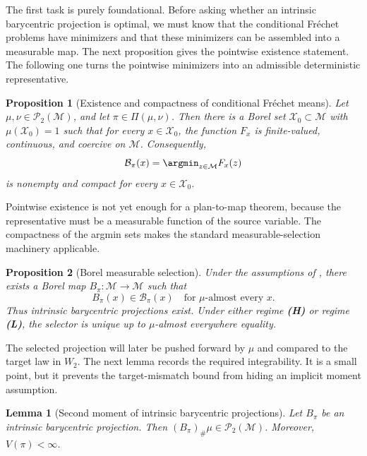 \documentclass[10pt]{article} %
\newtheorem{proposition}[proposition]{Proposition}
\newtheorem{lemma}[lemma]{Lemma}
\theoremstyle{definition}
\providecommand{\1}{\mathbf{1}}
\providecommand{\sM}{\mathcal{M}}
\providecommand{\sX}{\mathcal{X}}
\begin{document}
The first task is purely foundational. Before asking whether an intrinsic barycentric projection is optimal, we must know that the conditional Fr\'echet problems have minimizers and that these minimizers can be assembled into a measurable map. The next proposition gives the pointwise existence statement. The following one turns the pointwise minimizers into an admissible deterministic representative.

\begin{proposition}[Existence and compactness of conditional Fr\'echet means]
\label{prop:existence_compactness}
Let $\mu,\nu\in\mathcal P_2(\sM)$, and let $\pi\in\Pi(\mu,\nu)$. Then there is a Borel set $\sX_0\subset\sM$ with $\mu(\sX_0)=1$ such that for every $x\in \sX_0$, the function $F_x$ is finite-valued, continuous, and coercive on $\sM$. Consequently,
\[
\mathcal B_\pi(x)=\argmin_{z\in\sM}F_x(z)
\]
is nonempty and compact for every $x\in \sX_0$.
\end{proposition}



Pointwise existence is not yet enough for a plan-to-map theorem, because the representative must be a measurable function of the source variable. The compactness of the argmin sets makes the standard measurable-selection machinery applicable.

\begin{proposition}[Borel measurable selection]
\label{prop:borel_selection}
Under the assumptions of , there exists a Borel map $B_\pi:\sM\to\sM$ such that
\[
B_\pi(x)\in\mathcal B_\pi(x)
\quad\text{for }\mu\text{-almost every }x.
\]
Thus intrinsic barycentric projections exist. Under either regime \textbf{(H)} or regime \textbf{(L)}, the selector is unique up to $\mu$-almost everywhere equality.
\end{proposition}


The selected projection will later be pushed forward by $\mu$ and compared to the target law in $W_2$. The next lemma records the required integrability. It is a small point, but it prevents the target-mismatch bound from hiding an implicit moment assumption.

\begin{lemma}[Second moment of intrinsic barycentric projections]
\label{lem:second_moment_B}
Let $B_\pi$ be an intrinsic barycentric projection. Then $(B_\pi)_\#\mu\in\mathcal P_2(\sM)$. Moreover, $V(\pi)<\infty$.
\end{lemma}
\end{document}
